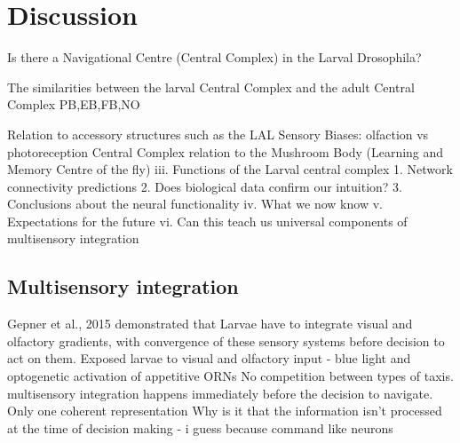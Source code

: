 \chapter{Discussion}
	Is there a Navigational Centre (Central Complex) in the Larval Drosophila?

	The similarities between the larval Central Complex and the adult Central Complex
        PB,EB,FB,NO

        Relation to accessory structures such as the LAL 
        Sensory Biases: olfaction vs photoreception
        Central Complex relation to the Mushroom Body (Learning and Memory Centre of the fly)
iii.	Functions of the Larval central complex 
1.	Network connectivity predictions
2.	Does biological data confirm our intuition?
3.	Conclusions about the neural functionality
iv.	What we now know
v.	Expectations for the future
vi.	Can this teach us universal components of multisensory integration 


\section{Multisensory integration}
 Gepner et al., 2015 demonstrated that Larvae  have to integrate visual and olfactory gradients, with convergence of these sensory systems before decision to act on them. 
 Exposed larvae to visual and olfactory input - blue light and optogenetic activation of appetitive ORNs
No competition between types of taxis. 
multisensory integration happens immediately before the decision to navigate. Only one coherent representation
Why is it that the information isn’t processed at the time of decision making  - i guess because command like neurons 


\section{}

